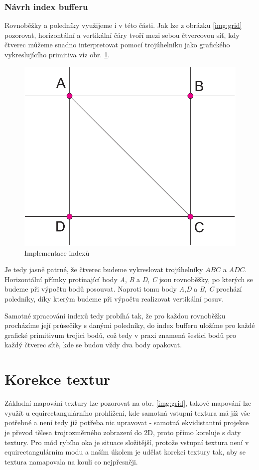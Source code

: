 \newpage

\subsubsection{Návrh index bufferu}
Rovnoběžky a poledníky využijeme i v této části. Jak lze z obrázku \ref{img:grid} pozorovat, horizontální a vertikální čáry tvoří mezi sebou čtvercovou síť, kdy čtverec můžeme snadno interpretovat pomocí trojúhelníku jako grafického vykreslujícího primitiva víz obr. \ref{img:indexes}.



\begin{figure}[h]
	\label{img:indexes}
	\centering
	\includegraphics[scale=1.0,angle=0,width=0.5\linewidth]{obrazky-figures/indexes}
	\caption{Implementace indexů}
\end{figure}

Je tedy jasně patrné, že čtverec budeme vykreslovat trojúhelníky $ABC$ a $ADC$. Horizontální přímky protínající body \textit{A}, \textit{B} a \textit{D}, \textit{C}   jsou rovnoběžky, po kterých se budeme při výpočtu bodů posouvat. Naproti tomu body \textit{A},\textit{D} a \textit{B}, \textit{C} prochází poledníky, díky kterým budeme při výpočtu realizovat vertikální posuv.

Samotné zpracování indexů tedy probíhá tak, že pro každou rovnoběžku procházíme její průsečíky s danými poledníky, do index bufferu uložíme pro každé grafické primitivum trojici bodů, což tedy v praxi znamená šestici bodů pro každý čtverec sítě, kde se budou vždy dva body opakovat.

\newpage

\section{Korekce textur}
Základní mapování textury lze pozorovat na obr. \ref{img:grid}, takové mapování lze využít u equirectangulárního prohlížení, kde samotná vstupní textura má jíž vše potřebné a není tedy již potřeba nic upravovat - samotná ekvidistantní projekce je převod tělesa trojrozměrného zobrazení do 2D, proto přímo koreluje s daty textury. Pro mód rybího oka je situace složitější, protože vstupní textura není v equirectangulárním modu a naším úkolem je udělat korekci textury tak, aby se textura namapovala na kouli co nejpřesněji.


